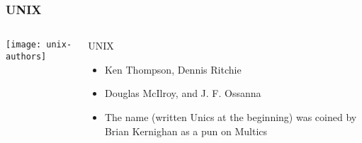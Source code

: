 %
%
\begin{frame}[plain]
	\frametitle{UNIX}
	
	
	
	\begin{columns}
		
		\begin{column}{.4\textwidth}
			
			\texttt{[image: unix-authors]}
			
		\end{column}
		
		\begin{column}{.6\textwidth}
			
			UNIX
			\begin{itemize}
				\item Ken Thompson, Dennis Ritchie
				\item Douglas McIlroy, and J. F. Ossanna
		 		\item  The name (written Unics at the beginning) was coined by Brian
		 		Kernighan as a pun on Multics
		 	
			\end{itemize}	
			
		\end{column}
		
		
	\end{columns}
	
	
\end{frame}

